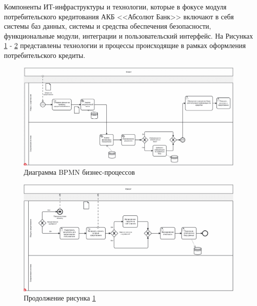 \documentclass[14pt, a4paper]{extarticle}
\begin{document}
Компоненты ИТ-инфраструктуры и технологии, которые в фокусе модуля
потребительского кредитования АКБ <<Абсолют Банк>> включают в себя системы баз
данных, системы и средства обеспечения безопасности, функциональные модули,
интеграции и пользовательский интерфейс. На Рисунках \ref{fig:bpmn0} -
\ref{fig:bpmn1} представлены технологии и процессы происходящие в рамках
оформления потребительского кредиты.

\begin{figure}[H]
	\centering
	\includegraphics[scale=0.3]{bpmn_diagram_0.png}
	\caption{Диаграмма BPMN бизнес-процессов}
	\label{fig:bpmn0}
\end{figure}

\begin{figure}[H]
	\centering
	\includegraphics[scale=0.33]{bpmn_diagram_1.png}
	\caption*{Продолжение рисунка \ref{fig:bpmn0}}
	\label{fig:bpmn1}
\end{figure}
\end{document}
